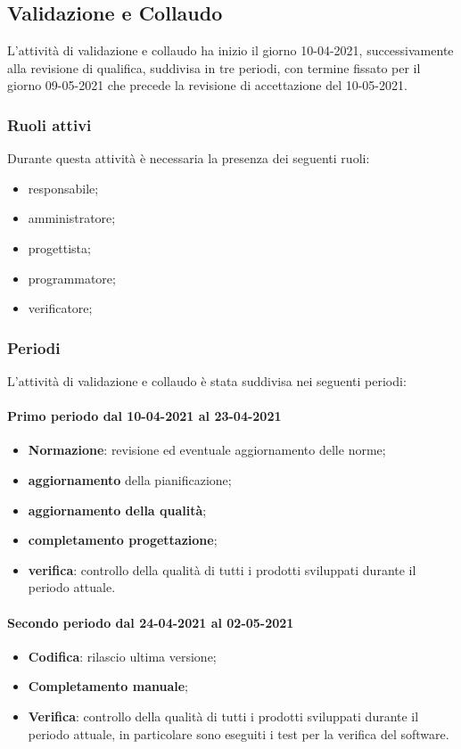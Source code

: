 \newpage 

\subsection{Validazione e Collaudo} 
L'attività di validazione e collaudo ha inizio il giorno 10-04-2021, successivamente alla revisione di 
qualifica, suddivisa in tre periodi, con termine fissato per il giorno 09-05-2021 che precede la revisione di accettazione del 10-05-2021. 

\subsubsection{Ruoli attivi} 
Durante questa attività è necessaria la presenza dei seguenti ruoli: 
\begin{itemize} 
	\item responsabile; 
	\item amministratore; 
	\item progettista; 
	\item programmatore; 
	\item verificatore; 
\end{itemize} 

\subsubsection{Periodi} 
L'attività di validazione e collaudo è stata suddivisa nei seguenti periodi: 
\paragraph{Primo periodo dal 10-04-2021 al 23-04-2021} 
\begin{itemize} 
	\item \textbf{Normazione}: revisione ed eventuale aggiornamento delle norme; 
	\item \textbf{aggiornamento} della pianificazione; 
	\item \textbf{aggiornamento della qualità}; 
	\item \textbf{completamento progettazione}; 
	\item \textbf{verifica}: controllo della qualità di tutti i prodotti sviluppati durante il periodo attuale. 
\end{itemize} 

\paragraph{Secondo periodo dal 24-04-2021 al 02-05-2021} 
\begin{itemize} 
	\item \textbf{Codifica}: rilascio ultima versione; 
	\item \textbf{Completamento manuale}; 
	\item \textbf{Verifica}: controllo della qualità di tutti i prodotti sviluppati durante il periodo attuale, in 
	particolare sono eseguiti i test per la verifica del software. 
\end{itemize} 


